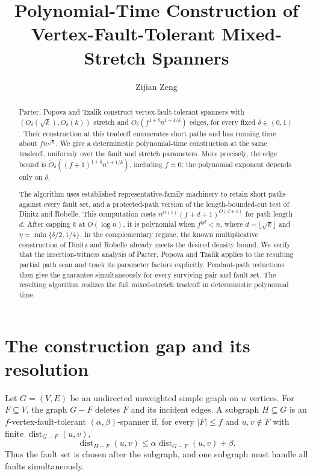\documentclass[acmsmall,11pt,screen,nonacm]{acmart}
\title{Polynomial-Time Construction of Vertex-Fault-Tolerant Mixed-Stretch Spanners}
\author{Zijian Zeng}
\affiliation{\institution{UCSI University}\country{Malaysia}}
\date{}
\newcommand{\dist}{\operatorname{dist}}
\begin{document}
\begin{abstract}
\normalsize
Parter, Popova and Tzalik construct vertex-fault-tolerant spanners with
$(O_\delta(\sqrt{k}),O_\delta(k))$ stretch and
$\widetilde{O}_\delta(f^{1+\delta}n^{1+1/k})$ edges, for every fixed
$\delta\in(0,1)$. Their construction at this tradeoff enumerates short
paths and has running time about $fn^{\sqrt{k}}$.
We give a deterministic polynomial-time construction at the same tradeoff,
uniformly over the fault and stretch parameters. More precisely, the edge
bound is $\widetilde{O}_\delta((f+1)^{1+\delta}n^{1+1/k})$, including $f=0$;
the polynomial exponent depends only on $\delta$.

The algorithm uses established representative-family machinery to retain
short paths against every fault set, and a protected-path version of the
length-bounded-cut test of Dinitz and Robelle. This computation costs
$n^{O(1)}(f+d+1)^{O(d+1)}$ for path length $d$.
After capping $k$ at $O(\log n)$, it is polynomial when
$f^{\eta d}<n$, where $d=\lfloor\sqrt{k}\rfloor$ and
$\eta=\min\{\delta/2,1/4\}$. In the complementary regime, the known
multiplicative construction of Dinitz and Robelle already meets the desired
density bound. We verify that the insertion-witness analysis of Parter,
Popova and Tzalik applies to the resulting partial path scan and track its
parameter factors explicitly. Pendant-path reductions then give the
guarantee simultaneously for every surviving pair and fault set.
The resulting algorithm realizes the full mixed-stretch tradeoff in
deterministic polynomial time.
\end{abstract}
\maketitle
\clearpage

\section{The construction gap and its resolution}

Let $G=(V,E)$ be an undirected unweighted simple graph on $n$ vertices.
For $F\subseteq V$, the graph $G-F$ deletes $F$ and its incident edges.
A subgraph $H\subseteq G$ is an $f$-vertex-fault-tolerant
$(\alpha,\beta)$-spanner if, for every $|F|\le f$ and $u,v\notin F$ with
finite $\dist_{G-F}(u,v)$,
\[
 \dist_{H-F}(u,v)\le \alpha\dist_{G-F}(u,v)+\beta.
\]
Thus the fault set is chosen after the subgraph, and one subgraph must
handle all faults simultaneously.
\end{document}
